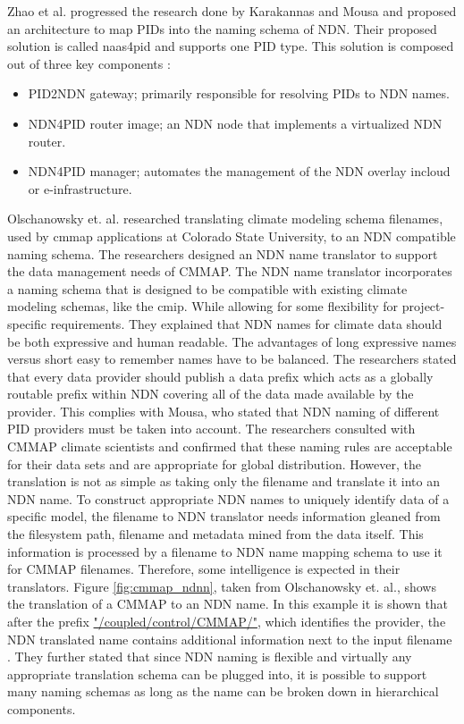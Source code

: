 Zhao et al. progressed the research done by Karakannas \cite{icn-bd} and Mousa \cite{ndn-app-aware} and proposed an architecture to map PIDs into the naming schema of NDN. Their proposed solution is called \gls{naas4pid} and supports one PID type. This solution is composed out of three key components \cite{koulouzis2018information}:
\begin{itemize}
  \item PID2NDN gateway; primarily responsible for resolving PIDs to NDN names.
  \item NDN4PID router image; an NDN node that implements a virtualized NDN router.
  \item NDN4PID manager; automates the management of the NDN overlay in\newline cloud or e-infrastructure.
\end{itemize}

Olschanowsky et. al. researched translating climate modeling schema filenames, used by \gls{cmmap} applications at Colorado State University, to an NDN compatible 
naming schema. The researchers designed an NDN name translator to support the data management needs of CMMAP. The NDN name translator incorporates a naming schema that is designed to be compatible with existing climate modeling schemas, like the \gls{cmip}. While allowing for some flexibility for project-specific requirements. They explained that NDN names for climate data should be both expressive and human readable. The advantages of long expressive names versus short easy to remember names have to be balanced.
The researchers stated that every data provider should publish a data prefix which acts as a globally
routable prefix within NDN covering all of the data made available by the provider. This complies with Mousa, who stated that NDN naming of different PID providers must be taken into account. The researchers consulted with CMMAP climate scientists and confirmed that these naming rules are acceptable for their data sets and are appropriate for global distribution. 
However, the translation is not as simple as taking only the filename and translate it into an NDN name. To construct appropriate NDN names to uniquely identify data of a specific model, the filename to NDN translator needs information gleaned from the filesystem path, filename and metadata mined from the data itself. This information is processed by a filename to NDN name mapping schema to use it for CMMAP filenames. Therefore, some intelligence is expected in their translators.
Figure \ref{fig:cmmap_ndnn}, taken from Olschanowsky et. al., shows the translation of a CMMAP to an NDN name. In this example it is shown that after the prefix \url{"/coupled/control/CMMAP/"}, which identifies the provider, the NDN translated name contains additional information next to the input filename \cite{ndn-clim}.
They further stated that since NDN naming is flexible and virtually any appropriate
translation schema can be plugged into, it is possible to support many naming schemas as long as the 
name can be broken down in hierarchical components.

